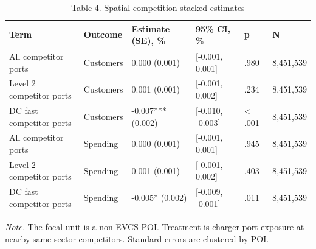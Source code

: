 \begin{table}[!htbp]
\centering
\caption{Table 4. Spatial competition stacked estimates}
\begin{tabular}{llllll}
\toprule
Term & Outcome & Estimate (SE), \% & 95\% CI, \% & p & N \\
\midrule
All competitor ports & Customers & 0.000 (0.001) & [-0.001, 0.001] & .980 & 8,451,539 \\
Level 2 competitor ports & Customers & 0.001 (0.001) & [-0.001, 0.002] & .234 & 8,451,539 \\
DC fast competitor ports & Customers & -0.007*** (0.002) & [-0.010, -0.003] & < .001 & 8,451,539 \\
All competitor ports & Spending & 0.000 (0.001) & [-0.001, 0.001] & .945 & 8,451,539 \\
Level 2 competitor ports & Spending & 0.001 (0.001) & [-0.001, 0.002] & .403 & 8,451,539 \\
DC fast competitor ports & Spending & -0.005* (0.002) & [-0.009, -0.001] & .011 & 8,451,539 \\
\bottomrule
\end{tabular}
\begin{minipage}{0.95\linewidth}\footnotesize\emph{Note.} The focal unit is a non-EVCS POI. Treatment is charger-port exposure at nearby same-sector competitors. Standard errors are clustered by POI.\end{minipage}
\end{table}
